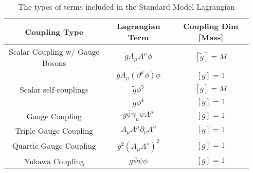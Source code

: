 \begin{center}
\begin{table}[]
\begin{center}
\caption{The types of terms included in the Standard Model Lagrangian \cite{tully}}
\begin{tabular}{ccc}
Coupling Type & Lagrangian Term &  Coupling Dim [Mass]\\
\hline
Scalar Coupling w/ Gauge Bosons & $\tilde{g} A_\mu A^\mu \phi$ & $[\tilde{g}] = M$ \\
& $g A_\mu(\partial^\mu \phi) \phi$ & $[g] =1$\\
Scalar self-couplings & $\tilde{g}\phi^3$ & $[\tilde{g}] = M$ \\
& $g \phi^4$ & $[g] = 1$ \\
Gauge Coupling & $g \bar \psi \gamma_\mu \psi A^\mu$ & $[g] = 1$ \\
Triple Gauge Coupling & $A_\mu A^\mu \partial_\nu A^\nu$ & $[g] = 1$ \\
Quartic Gauge Coupling & $g^2 (A_\mu A^\nu)^2$ & $[g] = 1$ \\
Yukawa Coupling & $g \bar \psi \psi \phi$ & $[g] = 1$ 
\end{tabular}
\label{tab:interactions}
\end{center}
\end{table}
\end{center}
